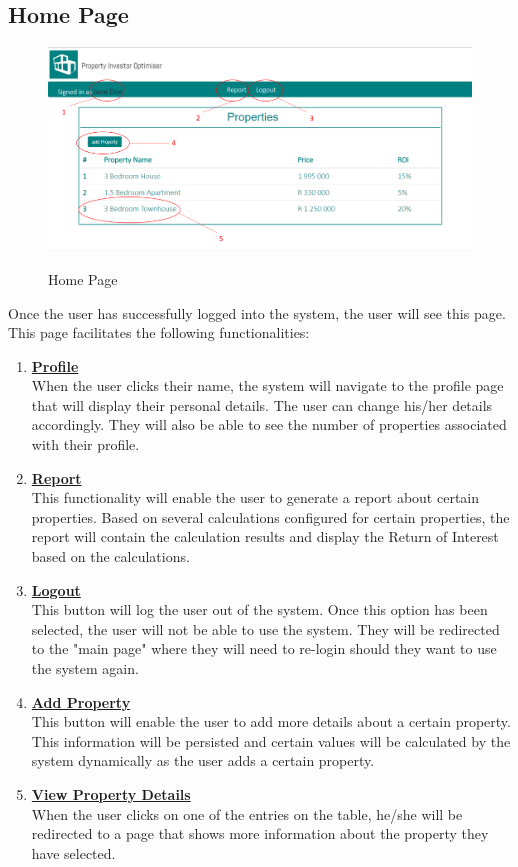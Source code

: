 \documentclass[a4paper,12pt]{article}
\begin{document}
\subsection{Home Page}
	\begin{figure}[H]
		\includegraphics[width=0.9\linewidth, center]{./System/Home.PNG}\\[0.4cm]  
		\caption{Home Page}
	\end{figure}
Once the user has successfully logged into the system, the user will see this page. This page facilitates the following functionalities:
	\begin{enumerate}
		\item{\underline{\bfseries Profile}}\\[0.2cm] 
		When the user clicks their name, the system will navigate to the profile page that will display their personal details. 				The user can change his/her details accordingly. They will also be able to see the number of properties associated 				with their profile.
		\bigskip
		\item{\underline{\bfseries Report}}\\[0.2cm] 
		This functionality will enable the user to generate a report about certain properties. Based on several calculations 				configured for certain properties, the report will contain the calculation results and display the Return of Interest based 			on the calculations. 
		\bigskip
		\item{\underline{\bfseries Logout}}\\[0.2cm] 
		This button will log the user out of the system. Once this option has been selected, the user will not be able to use the 				system. They will be redirected to the "main page" where they will need to re-login should they want to use the system 				again. 
		\bigskip
		\item{\underline{\bfseries Add Property}}\\[0.2cm] 
		This button will enable the user to add more details about a certain property. This information will be persisted and 				certain values will be calculated by the system dynamically as the user adds a certain property.
		\bigskip
		\item{\underline{\bfseries View Property Details}}\\[0.2cm] 
		When the user clicks on one of the entries on the table, he/she will be redirected to a page that shows more information 		about the property they have selected.
	\end{enumerate}
\end{document}
